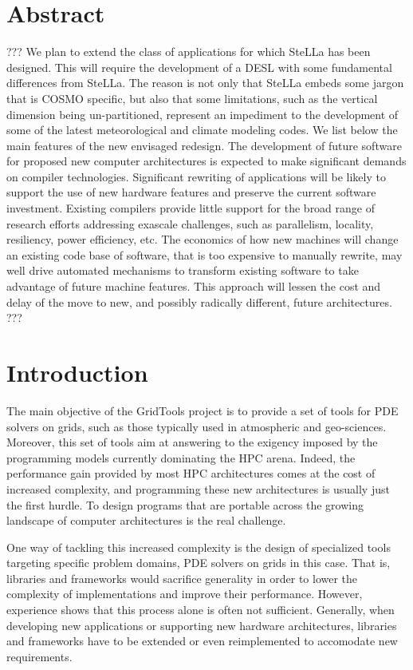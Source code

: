 \documentclass[english]{article}
\begin{document}
\section{Abstract}
???
 We plan to extend the class of applications for which SteLLa has been designed. This will require the development of a DESL with some fundamental differences from SteLLa. The reason is not only that SteLLa embeds some jargon that is COSMO specific, but also that some limitations, such as the vertical dimension being un-partitioned, represent an impediment to the development of some of the latest meteorological and climate modeling codes. We list below the main features of the new envisaged redesign.
The development of future software for proposed new computer
architectures is expected to make significant demands on compiler
technologies. Significant rewriting of applications will be likely to
support the use of new hardware features and preserve the current
software investment. Existing compilers provide little support for
the broad range of research efforts addressing exascale challenges,
such as parallelism, locality, resiliency, power efficiency, etc. The
economics of how new machines will change an existing code base
of software, that is too expensive to manually rewrite, may well
drive automated mechanisms to transform existing software to take
advantage of future machine features. This approach will lessen the
cost and delay of the move to new, and possibly radically different,
future architectures.
???


\section{Introduction}
The main objective of the GridTools project is to provide a set of tools for PDE solvers on grids, such as those typically used in atmospheric and geo-sciences. Moreover, this set of tools aim at answering to the exigency imposed by the programming models currently dominating the HPC arena.
Indeed, the performance gain provided by most HPC architectures comes at the cost of increased complexity, and programming these new architectures is usually just the first hurdle.
To design programs that are portable across the growing landscape of computer architectures is the real challenge.

One way of tackling this increased complexity is the design of specialized tools targeting specific problem domains, PDE solvers on grids in this case.
That is, libraries and frameworks would sacrifice generality in order to lower the complexity of implementations and improve their performance.
However, experience shows that this process alone is often not sufficient. 
Generally, when developing new applications or supporting new hardware architectures, libraries and frameworks have to be extended or even reimplemented to accomodate new requirements.
\end{document}
